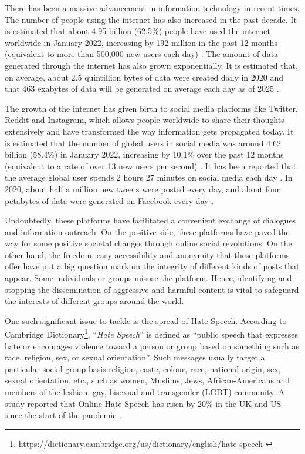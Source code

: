 There has been a massive advancement in information technology in recent times. The number of people using the internet has also increased in the past decade. It is estimated that about 4.95 billion (62.5\%) people have used the internet worldwide in January 2022, increasing by 192 million in the past 12 months (equivalent to more than 500,000 new users each day) \cite{datareportal_stats}. The amount of data generated through the internet has also grown exponentially. It is estimated that, on average, about 2.5 quintillion bytes of data were created daily in 2020 and that 463 exabytes of data will be generated on average each day as of 2025 \cite{techjury}.

The growth of the internet has given birth to social media platforms like Twitter, Reddit and Instagram, which allows people worldwide to share their thoughts extensively and have transformed the way information gets propagated today. It is estimated that the number of global users in social media was around 4.62 billion (58.4\%) in January 2022, increasing by 10.1\% over the past 12 months (equivalent to a rate of over 13 new users per second) \cite{datareportal_stats}. It has been reported that the average global user spends 2 hours 27 minutes on social media each day \cite{datareportal_stats}. In 2020, about half a million new tweets were posted every day, and about four petabytes of data were generated on Facebook every day \cite{techjury}.

Undoubtedly, these platforms have facilitated a convenient exchange of dialogues and information outreach. On the positive side, these platforms have paved the way for some positive societal changes through online social revolutions. On the other hand, the freedom, easy accessibility and anonymity that these platforms offer have put a big question mark on the integrity of different kinds of posts that appear. Some individuals or groups misuse the platform. Hence, identifying and stopping the dissemination of aggressive and harmful content is vital to safeguard the interests of different groups around the world.

One such significant issue to tackle is the spread of Hate Speech. According to Cambridge Dictionary\footnote{\url{https://dictionary.cambridge.org/us/dictionary/english/hate-speech
}}, ``\emph{Hate Speech}'' is defined as ``public speech that expresses hate or encourages violence toward a person or group based on something such as race, religion, sex, or sexual orientation''. Such messages usually target a particular social group basis religion, caste, colour, race, national origin, sex, sexual orientation, etc., such as women, Muslims, Jews, African-Americans and 
members of the lesbian, gay, bisexual and transgender (LGBT) community. A study reported that Online Hate Speech has risen by 20\% in the UK and US since the start of the pandemic \cite{baggs_2021}.

